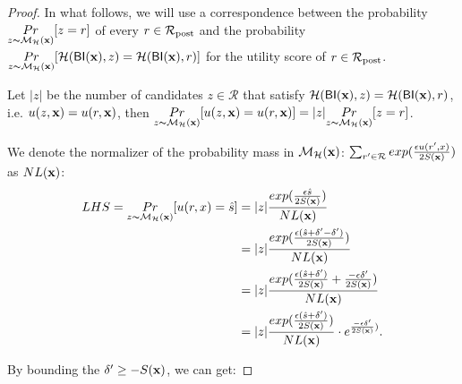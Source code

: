 \documentclass{article}
\begin{document}
\begin{proof}

In what follows, we will use a correspondence between the probability
 $\underset{z \thicksim \mathcal{M}_{\mathcal{H}}(\textbf{x})}{Pr}[z = r]$ of every
 $r\in\mathcal{R}_{\textup{post}}$ and the probability 
 $\underset{z \thicksim \mathcal{M}_{\mathcal{H}}(\textbf{x})}{Pr}[\mathcal{H}(\mathsf{BI}(\textbf{x}),z) =
 \mathcal{H}(\mathsf{BI}(\textbf{x}),r)]$ for the utility score of $r \in \mathcal{R}_{\textup{post}}$. 

 Let $|z|$ be the number of candidates $z \in \mathcal{R}$ that satisfy $\mathcal{H}(\mathsf{BI}(\textbf{x}),z) = \mathcal{H}(\mathsf{BI}(\textbf{x}),r)$, i.e. $u(z,\textbf{x}) = u(r,\textbf{x})$, then  $\underset{z \thicksim \mathcal{M}_{\mathcal{H}}(\textbf{x})}{Pr}[u(z,\textbf{x}) = u(r,\textbf{x})] = |z| \underset{z \thicksim \mathcal{M}_{\mathcal{H}}(\textbf{x})}{Pr}[z = r]$.


		We denote the normalizer of the probability mass in $\mathcal{M}_{\mathcal{H}}(\textbf{x})$: $\sum_{r' \in \mathcal{R}}exp(\frac{\epsilon u(r',x)}{2 S(\textbf{x})})$ as $NL(\textbf{x})$:
		\begin{equation*}
		\begin{split}
		LHS 
		  = \underset{z \thicksim \mathcal{M}_{\mathcal{H}}(\textbf{x})}{Pr}[u(r,x) = \hat{s}]
		& = |z| \frac{exp(\frac{\epsilon \hat{s}}{2 S(\textbf{x})})}{NL(\textbf{x})}\\
		& = |z| \frac{exp(\frac{\epsilon (\hat{s} + \delta' - \delta')}{2 S(\textbf{x})})}{NL(\textbf{x})}\\
		& = |z| \frac{exp(\frac{\epsilon (\hat{s} + \delta')}{2 S(\textbf{x})} + \frac{- \epsilon \delta'}{2 S(\textbf{x})})}{NL(\textbf{x})}\\
		& = |z| \frac{exp(\frac{\epsilon (\hat{s} + \delta')}{2 S(\textbf{x})})}{NL(\textbf{x})} \cdot e^{\frac{- \epsilon \delta'}{2 S(\textbf{x})})}.\\
		\end{split}
		\end{equation*}

		By bounding the $\delta' \geq -S(\textbf{x})$, we can get:


\end{proof}
\end{document}
